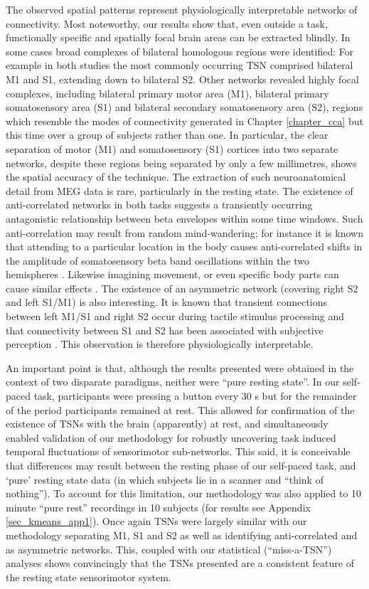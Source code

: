 The observed spatial patterns represent physiologically interpretable networks of connectivity. Most noteworthy, our results show that, even outside a task, functionally specific and spatially focal brain areas can be extracted blindly. In some cases broad complexes of bilateral homologous regions were identified: For example in both studies the most commonly occurring TSN comprised bilateral M1 and S1, extending down to bilateral S2. Other networks revealed highly focal complexes, including bilateral primary motor area (M1), bilateral primary somatosensory area (S1) and bilateral secondary somatosensory area (S2), regions which resemble the modes of connectivity generated in Chapter \ref{chapter_cca} but this time over a group of subjects rather than one. In particular, the clear separation of motor (M1) and somatosensory (S1) cortices into two separate networks, despite these regions being separated by only a few millimetres, shows the spatial accuracy of the technique. The extraction of such neuroanatomical detail from MEG data is rare, particularly in the resting state. The existence of anti-correlated networks in both tasks suggests a transiently occurring antagonistic relationship between beta envelopes within some time windows. Such anti-correlation may result from random mind-wandering; for instance it is known that attending to a particular location in the body causes anti-correlated shifts in the amplitude of somatosensory beta band oscillations within the two hemispheres \citep{Bauer2012,VanEde2014}. Likewise imagining movement, or even specific body parts can cause similar effects \citep{Brinkman2014,DeLange2008}. The existence of an asymmetric network (covering right S2 and left S1/M1) is also interesting. It is known that transient connections between left M1/S1 and right S2 occur during tactile stimulus processing \citep{Simoes2003} and that connectivity between S1 and S2 has been associated with subjective perception \citep{Ploner2009}. This observation is therefore physiologically interpretable. 

An important point is that, although the results presented were obtained in the context of two disparate paradigms, neither were “pure resting state”. In our self-paced task, participants were pressing a button every 30 s but for the remainder of the period participants remained at rest. This allowed for confirmation of the existence of TSNs with the brain (apparently) at rest, and simultaneously enabled validation of our methodology for robustly uncovering task induced temporal fluctuations of sensorimotor sub-networks. This said, it is conceivable that differences may result between the resting phase of our self-paced task, and ‘pure’ resting state data (in which subjects lie in a scanner and “think of nothing”). To account for this limitation, our methodology was also applied to 10 minute “pure rest” recordings in 10 subjects (for results see Appendix \ref{sec_kmeans_app1}). Once again TSNs were largely similar with our methodology separating M1, S1 and S2 as well as identifying anti-correlated and as asymmetric networks. This, coupled with our statistical (“miss-a-TSN”) analyses shows convincingly that the TSNs presented are a consistent feature of the resting state sensorimotor system.

